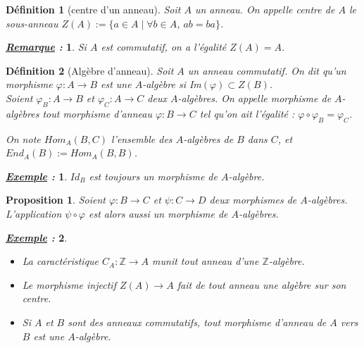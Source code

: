 \documentclass{article}           %
\newcommand\Z{\mathbb{Z}}
\newcommand\tq{\hspace{0.3cm}} 		%
\theoremstyle{break}
\theoremstyle{add}
\theoremstyle{break} %
\newtheorem{definition}{Définition}[section]
\newtheorem{proposition}{Proposition}[section]
\theoremstyle{add}
\newtheorem*{exemple}{\textit{\underline{Exemple} :}}
\newtheorem*{remarque}{\textit{\underline{Remarque} : }}
\newcommand\NL{
\mbox{}
\vspace*{-\parsep}
\vspace*{-\baselineskip}}
\begin{document}
\begin{definition}[centre d'un anneau]
Soit $A$ un anneau. On appelle \textit{centre de $A$} le sous-anneau $Z(A) := \{ a \in A \; | \; \forall b \in A$, \tq $ab=ba \}$. \\
\end{definition}

\begin{remarque}
Si $A$ est commutatif, on a l'égalité $Z(A)=A$.
\end{remarque}

\begin{definition}[Algèbre d'anneau]
Soit $A$ un anneau commutatif. On dit qu'un morphisme $\varphi : A \rightarrow B$ est une $A$-algèbre si Im$(\varphi) \subset Z(B)$. \\

Soient $\varphi_B : A \rightarrow B$ et $\varphi_C : A \rightarrow C$ deux $A$-algèbres. On appelle \textit{morphisme de $A$-algèbres} tout morphisme d'anneau $\varphi : B \rightarrow C$ tel qu'on ait l'égalité : $\varphi \circ \varphi_B = \varphi_C$. \\


On note $Hom_A(B,C)$ l'ensemble des $A$-algèbres de $B$ dans $C$, et $End_A(B) := Hom_A(B,B)$.
\end{definition}

\begin{exemple}
$Id_B$ est toujours un morphisme de $A$-algèbre.
\end{exemple}

\begin{proposition}
Soient $\varphi : B \rightarrow C$ et $\psi : C \rightarrow D$ deux morphismes de $A$-algèbres. L'application $\psi \circ \varphi$ est alors aussi un morphisme de $A$-algèbres.\\
\end{proposition}


\begin{exemple}\NL
\begin{itemize}
\item La caractéristique $C_A : \Z \rightarrow A$ munit tout anneau d'une $\Z$-algèbre.
\item Le morphisme injectif $Z(A) \rightarrow A$ fait de tout anneau une algèbre sur son centre.
\item Si $A$ et $B$ sont des anneaux commutatifs, tout morphisme d'anneau de $A$ vers $B$ est une $A$-algèbre.
\end{itemize}
\end{exemple}
\end{document}
